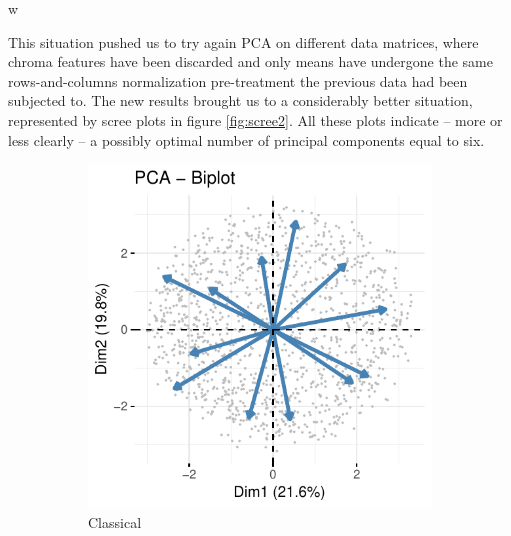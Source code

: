 w\documentclass[11pt, oneside]{article}
\begin{document}
This situation pushed us to try again PCA on different data matrices, where chroma features have been discarded and only means have undergone the same rows-and-columns normalization pre-treatment the previous data had been subjected to. The new results brought us to a considerably better situation, represented by scree plots in figure \ref{fig:scree2}. All these plots indicate -- more or less clearly -- a possibly optimal number of principal components equal to six.

\begin{figure}[h!]
\centering  
\begin{subfigure}[b]{0.5\textwidth}
        \includegraphics[width=\textwidth]{class_bipl.pdf} 
        \caption{Classical}
    \end{subfigure}%
    \begin{subfigure}[b]{0.5\textwidth}

\end{subfigure}
\end{figure}
\end{document}
